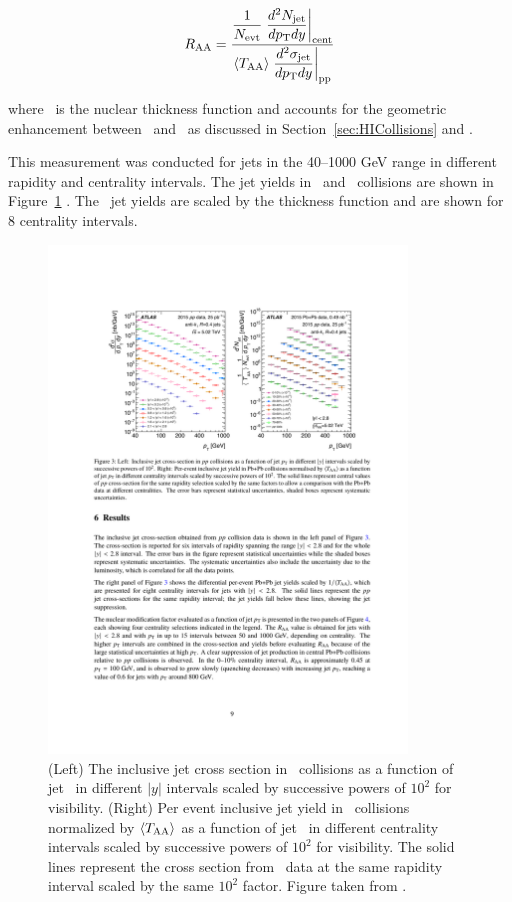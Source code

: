 \begin{align}
\mbox{$R_{\rm AA}$}  = \dfrac{\dfrac{1}{N_{\rm evt}} \left. \dfrac{d^2 N_{\rm jet}}{d\mbox{$p_{\mathrm{T}}$} dy} \right|_{\rm cent}}{ \langle T_{\rm AA} \rangle \left. \dfrac{d^2\sigma_{\rm jet}}{d\mbox{$p_{\mathrm{T}}$} dy} \right|_{\rm pp}}
\end{align}

where \TAA\ is the nuclear thickness function and accounts for the geometric enhancement between \pp\ and \pbpb\ as discussed in Section~\ref{sec:HICollisions} and \cite{doi:10.1146/annurev.nucl.57.090506.123020}. 

This measurement was conducted for jets in the 40--1000 GeV range in different rapidity and centrality intervals. The jet yields in \pp\ and \pbpb\ collisions are shown in Figure~\ref{fig:jet_yields} . The \pbpb\ jet yields are scaled by the thickness function and are shown for 8 centrality intervals. 

\begin{figure}[htbp]
\begin{center}
\includegraphics[width=0.85\textwidth]{figures/jetMeasurements/jetYields}
\caption{(Left) The inclusive jet cross section in \pp\ collisions as a function of jet \pt\ in different $|y|$ intervals scaled by successive powers of $10^2$ for visibility. (Right) Per event inclusive jet yield in \pbpb\ collisions normalized by $\langle \mbox{$T_{\mathrm{AA}}$} \rangle$ as a function of jet \pt\ in different centrality intervals scaled by successive powers of $10^2$ for visibility. The solid lines represent the cross section from \pp\ data at the same rapidity interval scaled by the same $10^2$ factor.  Figure taken from \cite{2019108}.}
\label{fig:jet_yields}
\end{center}
\end{figure}


